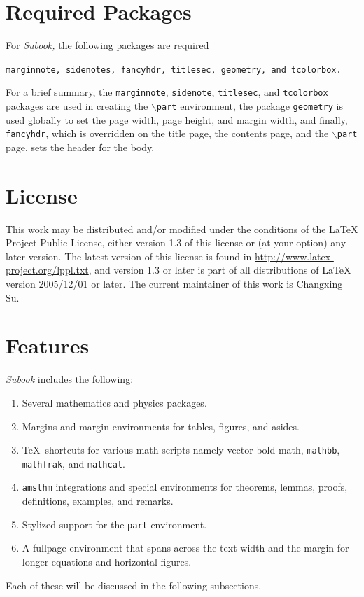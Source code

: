 \documentclass[]{subook}
\begin{document}
\section{Required Packages}\label{sec:reqpackages}
For \textit{Subook,} the following packages are required
\begin{center}
    \texttt{marginnote, sidenotes, fancyhdr, titlesec, geometry, and tcolorbox.}
\end{center}
For a brief summary, the \texttt{marginnote}, \texttt{sidenote}, \texttt{titlesec}, 
and \texttt{tcolorbox} packages are used in creating the \texttt{$\backslash$part} environment, 
the package \texttt{geometry} is used globally to set the page width, page height, 
and margin width, and finally, \texttt{fancyhdr}, 
which is overridden on the title page, 
the contents page, and the \texttt{$\backslash$part} page, sets the header for the body.



\section{License}\label{sec:license}
This work may be distributed and/or modified under the conditions of the LaTeX Project Public License, 
either version 1.3 of this license or (at your option) any later version. 
The latest version of this license is found in  \url{http://www.latex-project.org/lppl.txt}, 
and version 1.3 or later is part of all distributions of LaTeX version 2005/12/01 or later. 
The current maintainer of this work is Changxing Su.

\section{Features}\label{sec:Features}

\textit{Subook} includes the following:
	\begin{enumerate}
		\item Several mathematics and physics packages.
		\item Margins and margin environments for tables, figures, and asides.
		\item \TeX\ shortcuts for various math scripts namely vector bold math, \texttt{mathbb}, \texttt{mathfrak}, and \texttt{mathcal}.
		\item \texttt{amsthm} integrations and special environments for theorems, lemmas, proofs, definitions, examples, and remarks.\
		\item Stylized support for the \texttt{part} environment.
		\item A fullpage environment that spans across the text width and the margin for longer equations and horizontal figures.
	\end{enumerate}
    Each of these will be discussed in the following subsections.
\end{document}
